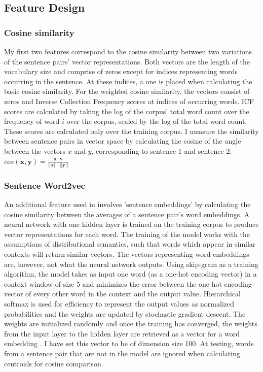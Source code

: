 \documentclass[11pt]{article}
\begin{document}
\subsection{Feature Design}
\subsubsection{Cosine similarity}
My first two features correspond to the cosine similarity between two variations of the sentence pairs' vector representations. Both vectors are the length of the vocabulary size and comprise of zeros except for indices representing words occurring in the sentence. At these indices, a one is placed when calculating the basic cosine similarity. For the weighted cosine similarity, the vectors consist of zeros and Inverse Collection Frequency scores at indices of occurring words.  ICF scores are calculated by taking the log of the corpus' total word count over the frequency of word $i$ over the corpus, scaled by the log of the total word count. These scores are calculated only over the training corpus.
I measure the similarity between sentence pairs in vector space by calculating the cosine of the angle between the vectors $x$ and $y$, corresponding to sentence 1 and sentence 2:\\

$cos(\pmb x, \pmb y) = \frac {\pmb x \cdot \pmb y}{||\pmb x|| \cdot ||\pmb y||}$



\subsubsection{Sentence Word2vec}
An additional feature used in \cite{arora2015dcu} involves 'sentence embeddings' by calculating the cosine similarity between the averages of a sentence pair's word embeddings.  A neural network with one hidden layer is trained on the training corpus to produce vector representations for each word. The training of the model works with the assumptions of distributional semantics, such that words which appear in similar contexts will return similar vectors. The vectors representing word embeddings are, however, not what the neural network outputs. Using skip-gram as a training algorithm, the model takes as input one word (as a one-hot encoding vector) in a context window of size 5 and minimizes the error between the one-hot encoding vector of every other word in the context and the output value.  Hierarchical softmax is used for efficiency to represent the output values as normalized probabilities and the weights are updated by stochastic gradient descent. The weights are initialized randomly and once the training has converged, the weights from the input layer to the hidden layer are retrieved as a vector for a word embedding \cite{mikolov2013efficient}. I have set this vector to be of dimension size 100.  At testing, words from a sentence pair that are not in the model are ignored when calculating centroids for cosine comparison. \\
\end{document}
